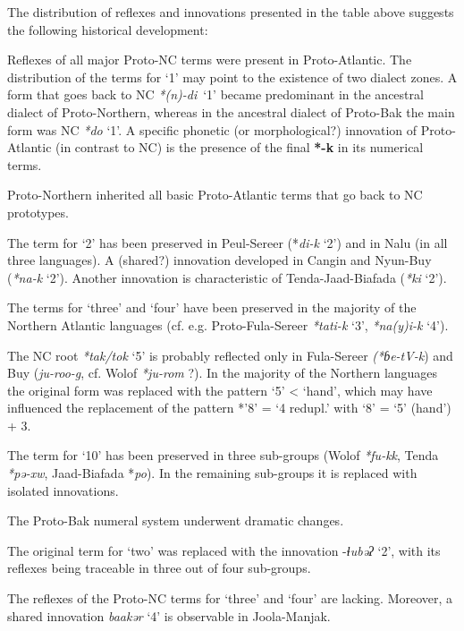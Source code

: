 The distribution of reflexes and innovations presented in the table above suggests the following historical development:

Reflexes of all major Proto-NC terms were present in Proto-Atlantic. The distribution of the terms for ‘1’ may point to the existence of two dialect zones. A form that goes back to NC \textit{*(n}\textit{)-di}~‘1’ became predominant in the ancestral dialect of Proto-Northern, whereas in the ancestral dialect of Proto-Bak the main form was NC \textit{*do} ‘1’. A specific phonetic (or morphological?) innovation of Proto-Atlantic (in contrast to NC) is the presence of the final \textbf{*-k} in its numerical terms.

Proto-Northern inherited all basic Proto-Atlantic terms that go back to NC prototypes. 

The term for ‘2’ has been preserved in Peul-Sereer (*\textit{di-k} ‘2’) and in Nalu (in all three languages). A (shared?) innovation developed in Cangin and Nyun-Buy (\textit{*na}\textit{-}\textit{k} ‘2’). Another innovation is characteristic of Tenda-Jaad-Biafada (\textit{*ki} ‘2’). 

The terms for ‘three’ and ‘four’ have been preserved in the majority of the Northern Atlantic languages (cf. e.g. Proto-Fula-Sereer \textit{*tati}\textit{-}\textit{k} ‘3’, \textit{*na}\textit{(y}\textit{)i}\textit{-}\textit{k} ‘4’). 

The NC root \textit{*tak/tok} ‘5’ is probably reflected only in Fula-Sereer \textit{(*ɓe-tV-k}) and Buy (\textit{ju-roo-g}, cf. Wolof \textit{*ju-rom} ?). In the majority of the Northern languages the original form was replaced with the pattern ‘5’ < ‘hand’, which may have influenced the replacement of the pattern *’8’ = ‘4 redupl.’ with ‘8’ = ‘5’ (hand’) + 3.

The term for ‘10’ has been preserved in three sub-groups (Wolof \textit{*fu-kk}, Tenda \textit{*pə-xw}, Jaad-Biafada *\textit{po}). In the remaining sub-groups it is replaced with isolated innovations.

The Proto-Bak numeral system underwent dramatic changes.

The original term for ‘two’ was replaced with the innovation -\textit{ɬubəʔ} ‘2’, with its reflexes being traceable in three out of four sub-groups.

The reflexes of the Proto-NC terms for ‘three’ and ‘four’ are lacking. Moreover, a shared innovation \textit{baakər} ‘4’ is observable in Joola-Manjak.


